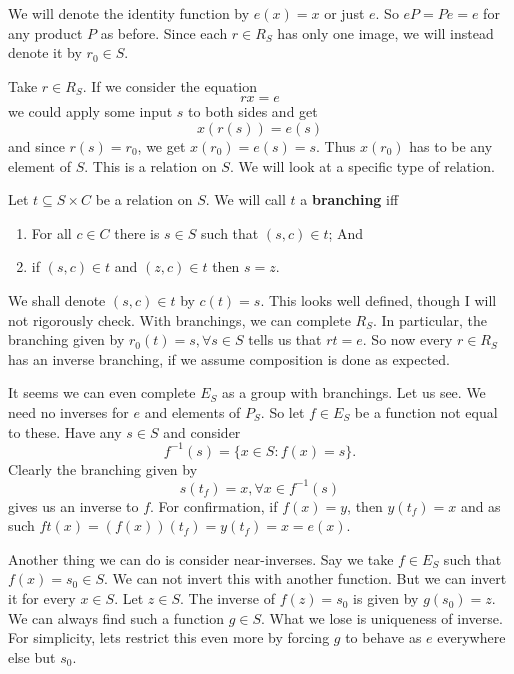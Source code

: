 \documentclass[11pt]{article}
\theoremstyle{plain}
\theoremstyle{nonumberplain}
\newcommand{\set}[1]{\{#1\}}
\begin{document}
We will denote the identity function by $e(x) = x$ or just $e$. So $eP = Pe = e$ for any product $P$ as before. Since each $r \in R_S$ has only one image, we will instead denote it by $r_0 \in S$.

Take $r \in R_S$. If we consider the equation \begin{equation}
    rx = e
\end{equation}
we could apply some input $s$ to both sides and get \begin{equation}
    x(r(s)) = e(s)
\end{equation}
and since $r(s) = r_0$, we get $x(r_0) = e(s) = s$. Thus $x(r_0)$ has to be any element of $S$. This is a relation on $S$. We will look at a specific type of relation. 

Let $t \subseteq S \times C$ be a relation on $S$. We will call $t$ a \textbf{branching} iff \begin{enumerate}
    \item For all $c \in C$ there is $s \in S$ such that $(s, c) \in t$; And
    \item if $(s, c) \in t$ and $(z, c) \in t$ then $s = z$.
\end{enumerate}

We shall denote $(s, c) \in t$ by $c(t) = s$. This looks well defined, though I will not rigorously check. With branchings, we can complete $R_S$. In particular, the branching given by $r_0(t) = s, \forall s \in S$ tells us that $rt = e$. So now every $r \in R_S$ has an inverse branching, if we assume composition is done as expected. 

It seems we can even complete $E_S$ as a group with branchings. Let us see. We need no inverses for $e$ and elements of $P_S$. So let $f \in E_S$ be a function not equal to these. Have any $s \in S$ and consider \begin{equation}
    f^{-1}(s) = \set {x \in S : f(x) = s}.
\end{equation}
Clearly the branching given by \begin{equation}
    s(t_f) = x, \forall x \in f^{-1}(s)
\end{equation}
gives us an inverse to $f$. For confirmation, if $f(x) = y$, then $y(t_f) = x$ and as such $ft(x) = (f(x))(t_f) = y(t_f) = x = e(x)$.

Another thing we can do is consider near-inverses. Say we take $f \in E_S$ such that $f(x) = s_0 \in S$. We can not invert this with another function. But we can invert it for every $x \in S$. Let $z \in S$. The inverse of $f(z) = s_0$ is given by $g(s_0) = z$. We can always find such a function $g \in S$. What we lose is uniqueness of inverse. For simplicity, lets restrict this even more by forcing $g$ to behave as $e$ everywhere else but $s_0$.
\end{document}

